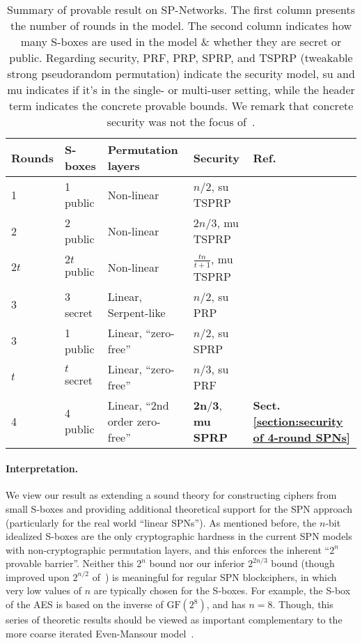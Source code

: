 \documentclass[journal=tosc,final,nohyperref]{iacrtrans}
\begin{document}
\begin{table}[]
    \centering
    \begin{tabular}{l|l|l|l|l}
        \hline
        \textbf{Rounds} & \textbf{S-boxes} & \textbf{Permutation layers} & \textbf{Security}  & \textbf{Ref.}\\
        \hline
        \hline
        1 & 1 public  &  Non-linear  & $n/2$, su TSPRP  & \cite{C:CDKLST18}  \\
        2 & 2 public  &  Non-linear  & $2n/3$, mu TSPRP & \cite{EPRINT:CogLee18}  \\
        $2t$ & $2t$ public  &  Non-linear  & $\frac{tn}{t+1}$, mu TSPRP & \cite{EPRINT:CogLee18}  \\
        \hline
        3 & 3 secret  &  Linear, Serpent-like  & $n/2$, su PRP  & \cite{FSE:IwaKur00}\\
        3 & 1 public  &  Linear, ``zero-free''  & $n/2$, su SPRP  & \cite{EPRINT:DKSTZ17}\\
        $t$ & $t$ secret  &  Linear, ``zero-free''  & $n/3$, su PRF  & \cite{miles2015substitution}\\
        4 & 4 public  &  Linear, ``2nd order zero-free''  & $\mathbf{2n/3}$, {\bf mu SPRP}  & {\bf Sect. \ref{section:security of 4-round SPNs}} \\
        \hline
    \end{tabular}
    \caption{Summary of provable result on SP-Networks. The first column presents the number of rounds in the model. The second column indicates how many S-boxes are used in the model \& whether they are secret or public. Regarding security, PRF, PRP, SPRP, and TSPRP (tweakable strong pseudorandom permutation) indicate the security model, su and mu indicates if it's in the single- or multi-user setting, while the header term indicates the concrete provable bounds. We remark that concrete security was not the focus of~\cite{miles2015substitution}.}
    \label{tab:my_label}
\end{table}




\paragraph{Interpretation.}


We view our result as extending a sound theory for constructing ciphers from small S-boxes and providing additional theoretical support for the SPN approach (particularly for the real world ``linear SPNs''). As mentioned before, the $n$-bit idealized S-boxes are the only cryptographic hardness in the current SPN models with non-cryptographic permutation layers, and this enforces the inherent ``$2^n$ provable barrier''. Neither this $2^n$ bound nor our inferior $2^{2n/3}$ bound (though improved upon $2^{n/2}$ of~\cite{C:CDKLST18}) is meaningful for regular SPN blockciphers, in which very low values of $n$ are typically chosen for the S-boxes. For example, the S-box of the AES is based on the inverse of $\text{GF}(2^8)$, and has $n=8$.
Though, this series of theoretic results should be viewed as important complementary to the more coarse iterated Even-Mansour model~\cite{EC:BKLSST12}.
\end{document}
